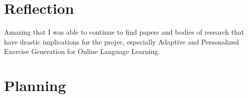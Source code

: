 \documentclass[
	letterpaper, %
]{jdf}
\begin{document}
\section{Reflection}
Amazing that I was able to continue to find papers and bodies of research that have drastic implications for the projec, especially Adaptive and Personalized Exercise Generation  for Online Language Learning.

\section{Planning}


\printbibliography{}
\end{document}
